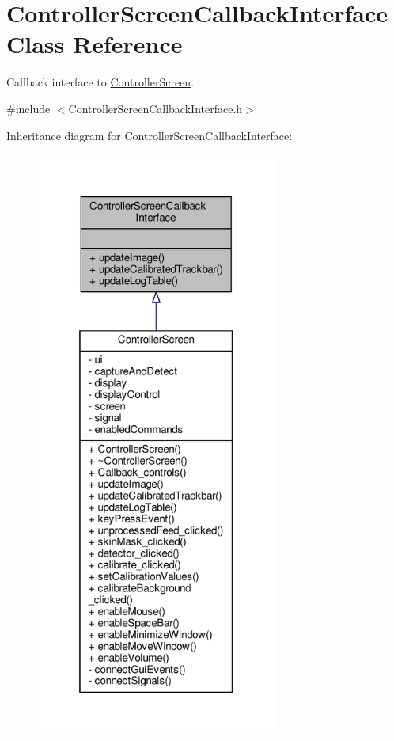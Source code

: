 \hypertarget{class_controller_screen_callback_interface}{}\section{Controller\+Screen\+Callback\+Interface Class Reference}
\label{class_controller_screen_callback_interface}


Callback interface to \hyperlink{class_controller_screen}{Controller\+Screen}.  




{\ttfamily \#include $<$Controller\+Screen\+Callback\+Interface.\+h$>$}



Inheritance diagram for Controller\+Screen\+Callback\+Interface\+:
\nopagebreak
\begin{figure}[H]
\begin{center}
\leavevmode
\includegraphics[height=550pt]{class_controller_screen_callback_interface__inherit__graph}
\end{center}
\end{figure}


